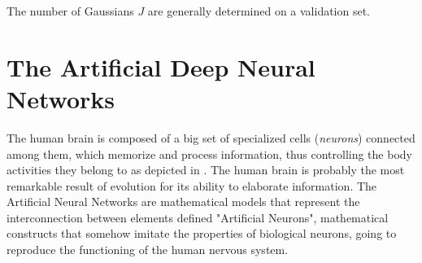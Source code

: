 The number of Gaussians $J$ are generally determined on a validation set.






















\section{The Artificial Deep Neural Networks}

The human brain is composed of a big set of specialized cells (\textit{neurons}) connected among them, which memorize and process information, thus controlling the body activities they belong to as depicted in . The human brain is probably the most remarkable result of evolution for its ability to elaborate information. 
The Artificial Neural Networks are mathematical models that represent the interconnection between elements defined "Artificial Neurons", mathematical constructs that somehow imitate the properties of biological neurons, going to reproduce the functioning of the human nervous system.

